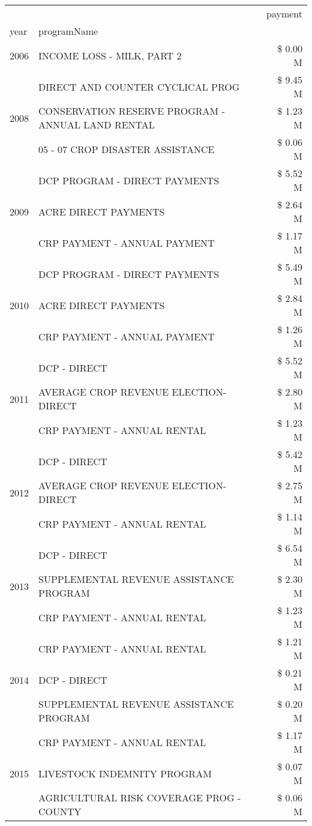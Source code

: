 \begin{tabular}{llr}
\toprule
 &  & payment \\
year & programName &  \\
\midrule
2006 & INCOME LOSS - MILK, PART 2 & \$ 0.00 M \\
\cline{1-3}
\multirow[t]{3}{*}{2008} & DIRECT AND COUNTER CYCLICAL PROG & \$ 9.45 M \\
 & CONSERVATION RESERVE PROGRAM - ANNUAL LAND RENTAL & \$ 1.23 M \\
 & 05 - 07 CROP DISASTER ASSISTANCE & \$ 0.06 M \\
\cline{1-3}
\multirow[t]{3}{*}{2009} & DCP PROGRAM - DIRECT PAYMENTS & \$ 5.52 M \\
 & ACRE DIRECT PAYMENTS & \$ 2.64 M \\
 & CRP PAYMENT - ANNUAL PAYMENT & \$ 1.17 M \\
\cline{1-3}
\multirow[t]{3}{*}{2010} & DCP PROGRAM - DIRECT PAYMENTS & \$ 5.49 M \\
 & ACRE DIRECT PAYMENTS & \$ 2.84 M \\
 & CRP PAYMENT - ANNUAL PAYMENT & \$ 1.26 M \\
\cline{1-3}
\multirow[t]{3}{*}{2011} & DCP - DIRECT & \$ 5.52 M \\
 & AVERAGE CROP REVENUE ELECTION-DIRECT & \$ 2.80 M \\
 & CRP PAYMENT - ANNUAL RENTAL & \$ 1.23 M \\
\cline{1-3}
\multirow[t]{3}{*}{2012} & DCP - DIRECT & \$ 5.42 M \\
 & AVERAGE CROP REVENUE ELECTION-DIRECT & \$ 2.75 M \\
 & CRP PAYMENT - ANNUAL RENTAL & \$ 1.14 M \\
\cline{1-3}
\multirow[t]{3}{*}{2013} & DCP - DIRECT & \$ 6.54 M \\
 & SUPPLEMENTAL REVENUE ASSISTANCE PROGRAM & \$ 2.30 M \\
 & CRP PAYMENT - ANNUAL RENTAL & \$ 1.23 M \\
\cline{1-3}
\multirow[t]{3}{*}{2014} & CRP PAYMENT - ANNUAL RENTAL & \$ 1.21 M \\
 & DCP - DIRECT & \$ 0.21 M \\
 & SUPPLEMENTAL REVENUE ASSISTANCE PROGRAM & \$ 0.20 M \\
\cline{1-3}
\multirow[t]{3}{*}{2015} & CRP PAYMENT - ANNUAL RENTAL & \$ 1.17 M \\
 & LIVESTOCK INDEMNITY PROGRAM & \$ 0.07 M \\
 & AGRICULTURAL RISK COVERAGE PROG - COUNTY & \$ 0.06 M \\

\end{tabular}
